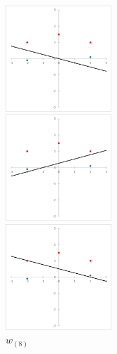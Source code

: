 \begin{figure}[H]
    \begin{minipage}{0.3\hsize}
        \begin{center}
            \includegraphics[width=40mm]{./figures/section_2/image6.eps}
            \captionsetup{labelformat=empty,labelsep=none}
            \caption{$w_{(6)}$}
        \end{center}
    \end{minipage}
    \begin{minipage}{0.3\hsize}
        \begin{center}
            \includegraphics[width=40mm]{./figures/section_2/image7.eps}
            \captionsetup{labelformat=empty,labelsep=none}
            \caption{$w_{(7)}$}
        \end{center}
    \end{minipage}
    \begin{minipage}{0.3\hsize}
        \begin{center}
            \includegraphics[width=40mm]{./figures/section_2/image8.eps}
            \captionsetup{labelformat=empty,labelsep=none}
            \caption{$w_{(8)}$}
        \end{center}
    \end{minipage}
\end{figure}
